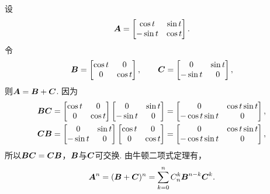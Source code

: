 \begin{example}
设\begin{equation*}
	\boldsymbol{A} = \begin{bmatrix}
	\cos t & \sin t \\
	-\sin t & \cos t
	\end{bmatrix}.
\end{equation*}
令\begin{equation*}
	\boldsymbol{B} = \begin{bmatrix}
		\cos t & 0 \\
		0 & \cos t
	\end{bmatrix},
	\qquad
	\boldsymbol{C} = \begin{bmatrix}
		0 & \sin t \\
		-\sin t & 0
	\end{bmatrix},
\end{equation*}
则\(\boldsymbol{A}=\boldsymbol{B}+\boldsymbol{C}\).
因为\begin{gather*}
	\boldsymbol{B}\boldsymbol{C} = \begin{bmatrix}
		\cos t & 0 \\
		0 & \cos t
	\end{bmatrix}
	\begin{bmatrix}
		0 & \sin t \\
		-\sin t & 0
	\end{bmatrix}
	= \begin{bmatrix}
		0 & \cos t \sin t \\
		-\cos t \sin t & 0
	\end{bmatrix}, \\
	\boldsymbol{C}\boldsymbol{B} = \begin{bmatrix}
		0 & \sin t \\
		-\sin t & 0
	\end{bmatrix}
	\begin{bmatrix}
		\cos t & 0 \\
		0 & \cos t
	\end{bmatrix}
	= \begin{bmatrix}
		0 & \cos t \sin t \\
		-\cos t \sin t & 0
	\end{bmatrix},
\end{gather*}
所以\(\boldsymbol{B}\boldsymbol{C}=\boldsymbol{C}\boldsymbol{B}\)，\(\boldsymbol{B}\)与\(\boldsymbol{C}\)可交换.
由牛顿二项式定理有，\begin{equation*}
	\boldsymbol{A}^n=(\boldsymbol{B}+\boldsymbol{C})^n
	=\sum_{k=0}^n C_n^k \boldsymbol{B}^{n-k} \boldsymbol{C}^k.
\end{equation*}
\end{example}

